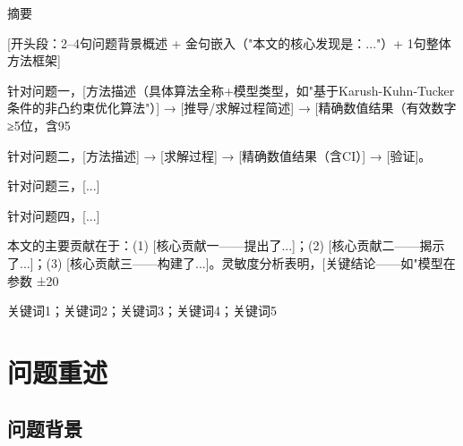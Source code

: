 \documentclass[12pt,a4paper]{article}
\begin{document}
\setcounter{page}{1}
\thispagestyle{fancy}

\begin{center}
    {\par}
    \vspace{1em}
    {\heiti 摘\quad 要\par}
\end{center}
\vspace{0.5em}

[开头段：2--4句问题背景概述 + 金句嵌入（"本文的核心发现是：..."）+ 1句整体方法框架]

针对问题一，[方法描述（具体算法全称+模型类型，如"基于Karush-Kuhn-Tucker条件的非凸约束优化算法"）] → [推导/求解过程简述] → [精确数值结果（有效数字 ≥5位，含95%

针对问题二，[方法描述] → [求解过程] → [精确数值结果（含CI）] → [验证]。

针对问题三，[...]

针对问题四，[...]

本文的主要贡献在于：(1) [核心贡献一——提出了...]；(2) [核心贡献二——揭示了...]；(3) [核心贡献三——构建了...]。灵敏度分析表明，[关键结论——如"模型在参数 ±20%

\vspace{0.5em}
关键词1；关键词2；关键词3；关键词4；关键词5

\newpage


\section{问题重述}
\subsection{问题背景}  %
\end{document}
